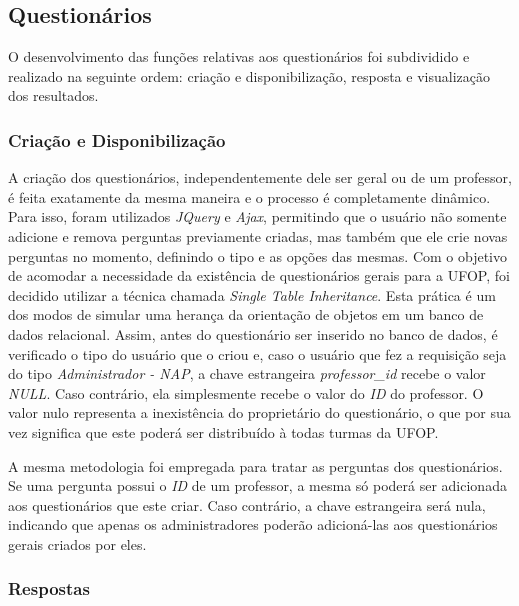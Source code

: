 \documentclass[
  12pt,       %
  openright,      %
  oneside,      %
  a4paper,      %
  english,      %
  french,        %
  spanish,     %
  brazil        %
  ]{abntex2-decsi}
\begin{document}
        \subsection{Questionários}

    	O desenvolvimento das funções relativas aos questionários foi subdividido e realizado na seguinte ordem: criação e disponibilização, resposta e visualização dos resultados.

            \subsubsection{Criação e Disponibilização}

            A criação dos questionários, independentemente dele ser geral ou de um professor, é feita exatamente da mesma maneira e o processo é completamente dinâmico. Para isso, foram utilizados \textit{JQuery} e \textit{Ajax}, permitindo que o usuário não somente adicione e remova perguntas previamente criadas, mas também que ele crie novas perguntas no momento, definindo o tipo e as opções das mesmas. Com o objetivo de acomodar a necessidade da existência de questionários gerais para a UFOP, foi decidido utilizar a técnica chamada \textit{Single Table Inheritance}. Esta prática é um dos modos de simular uma herança da orientação de objetos em um banco de dados relacional. Assim, antes do questionário ser inserido no banco de dados, é verificado o tipo do usuário que o criou e, caso o usuário que fez a requisição seja do tipo \textit{Administrador - NAP}, a chave estrangeira \textit{professor\_id} recebe o valor \textit{NULL}. Caso contrário, ela simplesmente recebe o valor do \textit{ID} do professor. O valor nulo representa a inexistência do proprietário do questionário, o que por sua vez significa que este poderá ser distribuído à todas turmas da UFOP.

            A mesma metodologia foi empregada para tratar as perguntas dos questionários. Se uma pergunta possui o \textit{ID} de um professor, a mesma só poderá ser adicionada aos questionários que este criar. Caso contrário, a chave estrangeira será nula, indicando que apenas os administradores poderão adicioná-las aos questionários gerais criados por eles.

            \subsubsection{Respostas}
\end{document}
